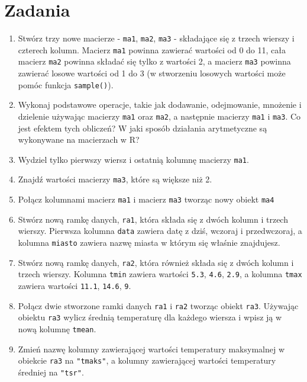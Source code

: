 \documentclass[paper=6in:9in,pagesize=pdftex,headinclude=on,footinclude=on,10pt]{scrbook}
\providecommand{\tightlist}{%
  \setlength{\itemsep}{0pt}\setlength{\parskip}{0pt}}
\begin{document}
\hypertarget{zadania-6}{%
\section{Zadania}\label{zadania-6}}

\begin{enumerate}
\def\labelenumi{\arabic{enumi})}
\tightlist
\item
  Stwórz trzy nowe macierze - \texttt{ma1}, \texttt{ma2}, \texttt{ma3} - składające się z trzech wierszy i czterech kolumn.
  Macierz \texttt{ma1} powinna zawierać wartości od 0 do 11, cała macierz \texttt{ma2} powinna składać się tylko z wartości 2, a macierz \texttt{ma3} powinna zawierać losowe wartości od 1 do 3 (w stworzeniu losowych wartości może pomóc funkcja \texttt{sample()}).
\item
  Wykonaj podstawowe operacje, takie jak dodawanie, odejmowanie, mnożenie i dzielenie używając macierzy \texttt{ma1} oraz \texttt{ma2}, a następnie macierzy \texttt{ma1} i \texttt{ma3}.
  Co jest efektem tych obliczeń?
  W jaki sposób działania arytmetyczne są wykonywane na macierzach w R?
\item
  Wydziel tylko pierwszy wiersz i ostatnią kolumnę macierzy \texttt{ma1}.
\item
  Znajdź wartości macierzy \texttt{ma3}, które są większe niż 2.
\item
  Połącz kolumnami macierz \texttt{ma1} i macierz \texttt{ma3} tworząc nowy obiekt \texttt{ma4}
\item
  Stwórz nową ramkę danych, \texttt{ra1}, która składa się z dwóch kolumn i trzech wierszy.
  Pierwsza kolumna \texttt{data} zawiera datę z dziś, wczoraj i przedwczoraj, a kolumna \texttt{miasto} zawiera nazwę miasta w którym się właśnie znajdujesz.
\item
  Stwórz nową ramkę danych, \texttt{ra2}, która również składa się z dwóch kolumn i trzech wierszy.
  Kolumna \texttt{tmin} zawiera wartości \texttt{5.3}, \texttt{4.6}, \texttt{2.9}, a kolumna \texttt{tmax} zawiera wartości \texttt{11.1}, \texttt{14.6}, \texttt{9}.
\item
  Połącz dwie stworzone ramki danych \texttt{ra1} i \texttt{ra2} tworząc obiekt \texttt{ra3}.
  Używając obiektu \texttt{ra3} wylicz średnią temperaturę dla każdego wiersza i wpisz ją w nową kolumnę \texttt{tmean}.
\item
  Zmień nazwę kolumny zawierającej wartości temperatury maksymalnej w obiekcie \texttt{ra3} na \texttt{"tmaks"}, a kolumny zawierającej wartości temperatury średniej na \texttt{"tsr"}.

\end{enumerate}
\end{document}
